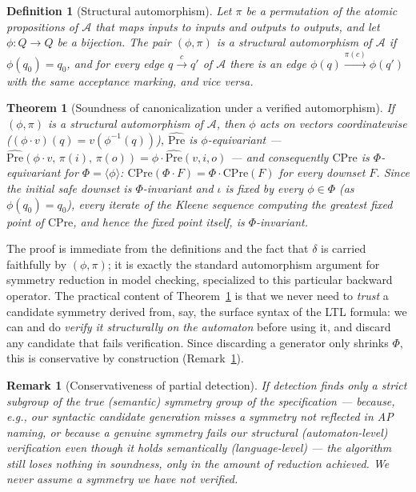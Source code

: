 \documentclass[11pt]{article}
\newtheorem{theorem}{Theorem}
\newtheorem{definition}{Definition}
\newtheorem{remark}{Remark}
\newcommand{\Aut}{\mathcal{A}}
\newcommand{\Q}{Q}
\newcommand{\Phigroup}{\Phi}
\newcommand{\CPre}{\mathrm{CPre}}
\newcommand{\PreHat}{\widehat{\mathrm{Pre}}}
\begin{document}
\begin{definition}[Structural automorphism]
Let $\pi$ be a permutation of the atomic propositions of $\Aut$ that maps
inputs to inputs and outputs to outputs, and let $\phi : \Q \to \Q$ be a
bijection. The pair $(\phi,\pi)$ is a \emph{structural automorphism} of
$\Aut$ if $\phi(q_0) = q_0$, and for every edge $q
\xrightarrow{c} q'$ of $\Aut$ there is an edge $\phi(q)
\xrightarrow{\pi(c)} \phi(q')$ with the same acceptance marking, and vice
versa.
\end{definition}

\begin{theorem}[Soundness of canonicalization under a verified automorphism]
\label{thm:auto-sound}
If $(\phi,\pi)$ is a structural automorphism of $\Aut$, then $\phi$ acts on
vectors coordinatewise ($(\phi \cdot v)(q) = v(\phi^{-1}(q))$), $\PreHat$ is
$\phi$-equivariant --- $\PreHat(\phi\cdot v,\, \pi(i),\, \pi(o)) = \phi \cdot
\PreHat(v, i, o)$ --- and consequently $\CPre$ is $\Phigroup$-equivariant
for $\Phigroup = \langle \phi \rangle$: $\CPre(\Phigroup \cdot F) =
\Phigroup \cdot \CPre(F)$ for every downset $F$. Since the initial safe
downset is $\Phigroup$-invariant and $\iota$ is fixed by every $\phi \in
\Phigroup$ (as $\phi(q_0)=q_0$), every iterate of the Kleene sequence
computing the greatest fixed point of $\CPre$, and hence the fixed point
itself, is $\Phigroup$-invariant.
\end{theorem}

The proof is immediate from the definitions and the fact that $\delta$ is
carried faithfully by $(\phi,\pi)$; it is exactly the standard automorphism
argument for symmetry reduction in model checking, specialized to this
particular backward operator. The practical content of
Theorem~\ref{thm:auto-sound} is that we never need to \emph{trust} a
candidate symmetry derived from, say, the surface syntax of the LTL
formula: we can and do \emph{verify it structurally on the automaton}
before using it, and discard any candidate that fails verification. Since
discarding a generator only shrinks $\Phigroup$, this is conservative by
construction (Remark~\ref{rem:conservative}).

\begin{remark}[Conservativeness of partial detection]
\label{rem:conservative}
If detection finds only a strict subgroup of the true (semantic) symmetry
group of the specification --- because, e.g., our syntactic candidate
generation misses a symmetry not reflected in AP naming, or because a
genuine symmetry fails our \emph{structural} (automaton-level) verification
even though it holds \emph{semantically} (language-level) --- the algorithm
still loses nothing in soundness, only in the amount of reduction achieved.
We never assume a symmetry we have not verified.
\end{remark}
\end{document}
